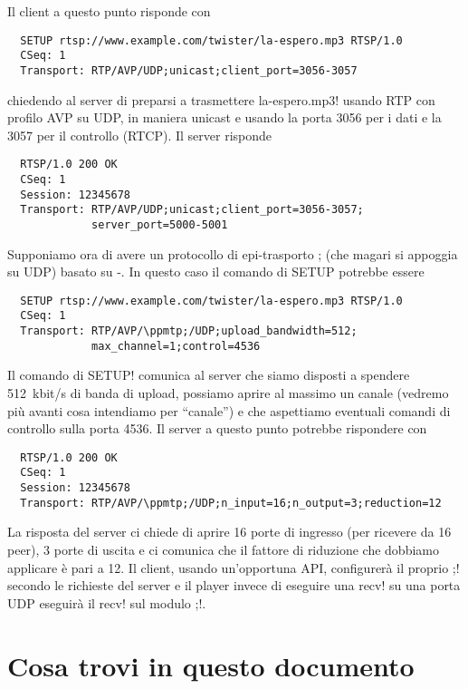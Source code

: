 \documentclass{rfc}
\begin{document}
Il client a questo punto risponde con

\begin{verbatim}
  SETUP rtsp://www.example.com/twister/la-espero.mp3 RTSP/1.0
  CSeq: 1
  Transport: RTP/AVP/UDP;unicast;client_port=3056-3057
\end{verbatim}
%
chiedendo al server di preparsi a trasmettere \ttt la-espero.mp3!
usando RTP con profilo AVP su UDP, in maniera unicast e usando la
porta 3056 per i dati e la 3057 per il controllo (RTCP).  Il server
risponde

\begin{verbatim}
  RTSP/1.0 200 OK
  CSeq: 1
  Session: 12345678
  Transport: RTP/AVP/UDP;unicast;client_port=3056-3057;
             server_port=5000-5001
\end{verbatim}
%
Supponiamo ora di avere un protocollo di epi-trasporto \ppmtp; (che
magari si appoggia su UDP) basato su \medusa-.  In questo caso il
comando di SETUP potrebbe essere

\begin{verbatim}
  SETUP rtsp://www.example.com/twister/la-espero.mp3 RTSP/1.0
  CSeq: 1
  Transport: RTP/AVP/\ppmtp;/UDP;upload_bandwidth=512;
             max_channel=1;control=4536
\end{verbatim}
%
Il comando di \ttt SETUP! comunica al server che siamo disposti a
spendere 512~kbit/s di banda di upload, possiamo aprire al massimo un
canale (vedremo pi\`u avanti cosa intendiamo per ``canale'') e che
aspettiamo eventuali comandi di controllo sulla porta 4536.  Il server
a questo punto potrebbe rispondere con 

\begin{verbatim}
  RTSP/1.0 200 OK
  CSeq: 1
  Session: 12345678
  Transport: RTP/AVP/\ppmtp;/UDP;n_input=16;n_output=3;reduction=12
\end{verbatim}
%
La risposta del server ci chiede di aprire 16 porte di ingresso (per
ricevere da 16 peer), 3 porte di uscita e ci comunica che il fattore
di riduzione che dobbiamo applicare \`e pari a 12.  Il client, usando
un'opportuna API, configurer\`a il proprio \ttt \ppmtp;! secondo le richieste
del server e il player invece di eseguire una \ttt recv! su una porta
UDP eseguir\`a il \ttt recv! sul modulo \ttt \ppmtp;!.

\section{Cosa trovi in questo documento}
\label{sub:6.1;transport_layer}
\end{document}
